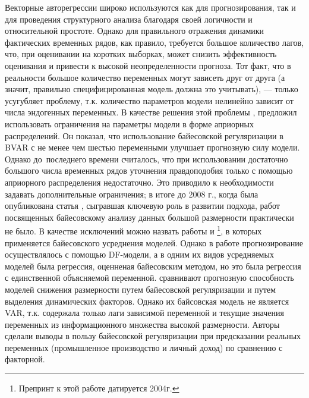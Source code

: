\documentclass[11pt]{article} %
\begin{document}
Векторные авторегрессии широко используются как для прогнозирования, так и для проведения структурного анализа благодаря своей логичности и относительной простоте. Однако для правильного отражения динамики фактических временных рядов, как правило, требуется большое количество лагов, что, при оценивании на коротких выборках, может снизить эффективность оценивания и привести к высокой неопределенности прогноза. Тот факт, что в реальности большое количество переменных могут зависеть друг от друга (а значит, правильно специфицированная модель должна это учитывать), --- только усугубляет проблему, т.к. количество параметров модели нелинейно зависит от числа эндогенных переменных. В качестве решения этой проблемы \cite{litterman_1979}, предложил использовать ограничения на параметры модели в форме априорных распределений. Он показал, что использование байесовской регуляризации в  BVAR с  не менее  чем шестью переменными  улучшает прогнозную силу модели. Однако до~последнего времени считалось, что при использовании достаточно большого числа временных рядов уточнения правдоподобия только с помощью априорного распределения недостаточно.  Это приводило к необходимости задавать дополнительные ограничения; в итоге до 2008 г., когда была опубликована статья \cite{demol_al_2008}, сыгравшая ключевую роль в развитии подхода, работ посвященных байесовскому анализу данных большой размерности практически не было. 
В качестве исключений можно назвать работы \cite{koop_potter_2004} и \cite{wright_2009}\footnote{Препринт к этой работе датируется 2004г.}, в которых применяется байесовского усреднения моделей. Однако в работе \cite{koop_potter_2004} прогнозирование осуществлялось с помощью DF-модели, а в \cite{wright_2009} одним их видов усредняемых моделей была регрессия, оценненая байесовским методом, но это была регрессия с единственной объясняемой переменной. \cite{giacomini_white_2006} сравнивают прогнозную способность моделей снижения размерности путем байесовской регуляризации и путем выделения динамических факторов. Однако их байсовская модель не является VAR, т.к. содержала только лаги зависимой переменной и текущие значения переменных из информационного множества высокой размерности. Авторы сделали выводы в пользу байесовской регуляризации при предсказании реальных переменных (промышленное производство и личный доход) по сравнению с факторной. 
\end{document}

